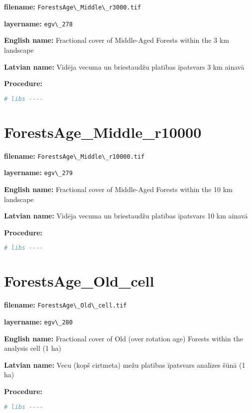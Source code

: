\documentclass[
]{book}
\newcommand{\passthrough}[1]{#1}
\begin{document}
\textbf{filename:} \passthrough{\lstinline!ForestsAge\_Middle\_r3000.tif!}

\textbf{layername:} \passthrough{\lstinline!egv\_278!}

\textbf{English name:} Fractional cover of Middle-Aged Forests within the 3 km landscape

\textbf{Latvian name:} Vidēja vecuma un briestaudžu platības īpatsvars 3 km ainavā

\textbf{Procedure:}

\begin{lstlisting}[language=R]
# libs ----
\end{lstlisting}

\section{ForestsAge\_Middle\_r10000}\label{ch06.279}

\textbf{filename:} \passthrough{\lstinline!ForestsAge\_Middle\_r10000.tif!}

\textbf{layername:} \passthrough{\lstinline!egv\_279!}

\textbf{English name:} Fractional cover of Middle-Aged Forests within the 10 km landscape

\textbf{Latvian name:} Vidēja vecuma un briestaudžu platības īpatsvars 10 km ainavā

\textbf{Procedure:}

\begin{lstlisting}[language=R]
# libs ----
\end{lstlisting}

\section{ForestsAge\_Old\_cell}\label{ch06.280}

\textbf{filename:} \passthrough{\lstinline!ForestsAge\_Old\_cell.tif!}

\textbf{layername:} \passthrough{\lstinline!egv\_280!}

\textbf{English name:} Fractional cover of Old (over rotation age) Forests within the analysis cell (1 ha)

\textbf{Latvian name:} Vecu (kopš cirtmeta) mežu platības īpatsvars analīzes šūnā (1 ha)

\textbf{Procedure:}

\begin{lstlisting}[language=R]
# libs ----
\end{lstlisting}
\end{document}
